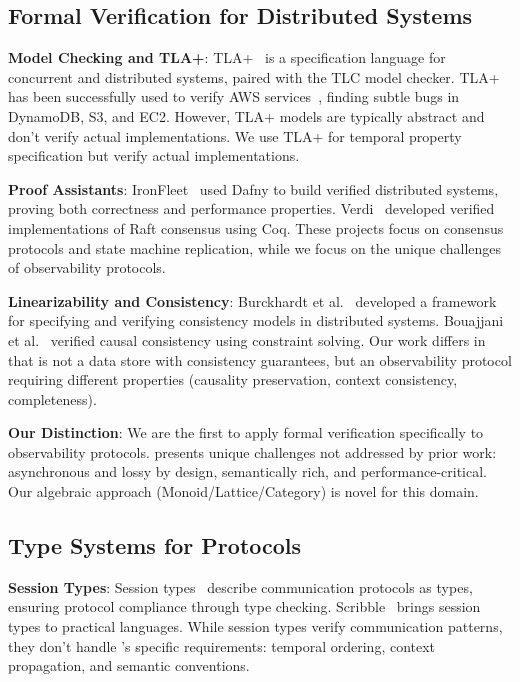 \subsection{Formal Verification for Distributed Systems}

\textbf{Model Checking and TLA+}: TLA+~\cite{lamport2002tla} is a specification language for concurrent and distributed systems, paired with the TLC model checker. TLA+ has been successfully used to verify AWS services~\cite{newcombe2015aws-tla}, finding subtle bugs in DynamoDB, S3, and EC2. However, TLA+ models are typically abstract and don't verify actual implementations. We use TLA+ for temporal property specification but verify actual \otlp implementations.

\textbf{Proof Assistants}: IronFleet~\cite{hawblitzel2015ironfleet} used Dafny to build verified distributed systems, proving both correctness and performance properties. Verdi~\cite{wilcox2015verdi} developed verified implementations of Raft consensus using Coq. These projects focus on consensus protocols and state machine replication, while we focus on the unique challenges of observability protocols.

\textbf{Linearizability and Consistency}: Burckhardt et al.~\cite{burckhardt2014consistency} developed a framework for specifying and verifying consistency models in distributed systems. Bouajjani et al.~\cite{bouajjani2017causal} verified causal consistency using constraint solving. Our work differs in that \otlp is not a data store with consistency guarantees, but an observability protocol requiring different properties (causality preservation, context consistency, completeness).

\textbf{Our Distinction}: We are the first to apply formal verification specifically to observability protocols. \otlp presents unique challenges not addressed by prior work: asynchronous and lossy by design, semantically rich, and performance-critical. Our algebraic approach (Monoid/Lattice/Category) is novel for this domain.

\subsection{Type Systems for Protocols}

\textbf{Session Types}: Session types~\cite{honda1998session-types} describe communication protocols as types, ensuring protocol compliance through type checking. Scribble~\cite{honda2016scribble} brings session types to practical languages. While session types verify communication patterns, they don't handle \otlp's specific requirements: temporal ordering, context propagation, and semantic conventions.

